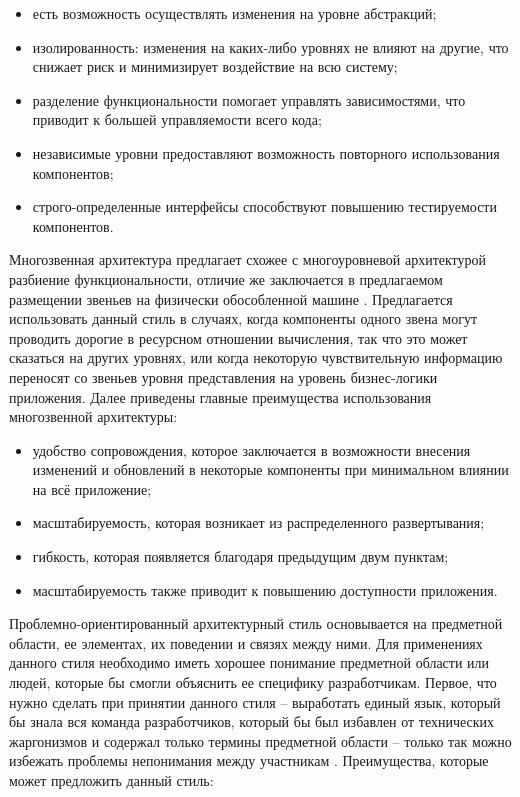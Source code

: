 \begin{itemize}
	\item есть возможность осуществлять изменения на уровне абстракций;
	\item изолированность: изменения на каких-либо уровнях не влияют на другие, что снижает риск и минимизирует воздействие на всю систему;
	\item разделение функциональности помогает управлять зависимостями, что приводит к большей управляемости всего кода;
	\item независимые уровни предоставляют возможность повторного использования компонентов;
	\item строго-определенные интерфейсы способствуют повышению тестируемости компонентов.
\end{itemize}

Многозвенная архитектура предлагает схожее с многоуровневой архитектурой разбиение функциональности, отличие же
заключается в предлагаемом размещении звеньев на физически обособленной машине \cite{architecture_volosevich}.
Предлагается использовать данный стиль в случаях, когда компоненты одного звена могут проводить дорогие в ресурсном
отношении вычисления, так что это может сказаться на других уровнях, или когда некоторую чувствительную информацию
переносят со звеньев уровня представления на уровень бизнес-логики приложения. Далее приведены главные преимущества
использования многозвенной архитектуры:

\begin{itemize}
  \item удобство сопровождения, которое заключается в возможности внесения изменений и обновлений в некоторые компоненты
  при минимальном влиянии на всё приложение;
	\item масштабируемость, которая возникает из распределенного развертывания;
	\item гибкость, которая появляется благодаря предыдущим двум пунктам;
	\item масштабируемость также приводит к повышению доступности приложения.
\end{itemize}

Проблемно-ориентированный архитектурный стиль основывается на предметной области, ее элементах, их поведении и
связях между ними. Для применениях данного стиля необходимо иметь хорошее понимание предметной области или людей,
которые бы смогли объяснить ее специфику разработчикам. Первое, что нужно сделать при принятии данного
стиля -- выработать единый язык, который бы знала вся команда разработчиков, который бы был избавлен от технических
жаргонизмов и содержал только термины предметной области -- только так можно избежать проблемы непонимания между
участникам \cite{ddd_quickly}. Преимущества, которые может предложить данный стиль:

